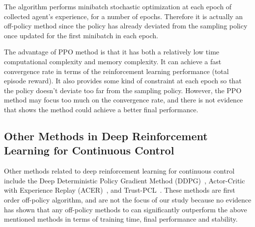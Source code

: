 The algorithm performs minibatch stochastic optimization at each epoch of collected agent's experience, for a number of epochs. Therefore it is actually an off-policy method since the policy has already deviated from the sampling policy once updated for the first minibatch in each epoch.


The advantage of PPO method is that it has both a relatively low time computational complexity and memory complexity. It can achieve a fast convergence rate in terms of the reinforcement learning performance (total episode reward). It also provides some kind of constraint at each epoch so that the policy doesn't deviate too far from the sampling policy. However, the PPO method may focus too much on the convergence rate, and there is not evidence that shows the method could achieve a better final performance.
\subsection{Other Methods in Deep Reinforcement Learning for Continuous Control}
Other methods related to deep reinforcement learning for continuous control include the Deep Deterministic Policy Gradient Method (DDPG)~\cite{lillicrap2015continuous}, Actor-Critic with Experience Replay (ACER)~\cite{wang2016sample}, and Trust-PCL~\cite{nachum2017trust}. These methods are first order off-policy algorithm, and are not the focus of our study because no evidence has shown that any off-policy methods to can significantly outperform the above mentioned methods in terms of training time, final performance and stability.
